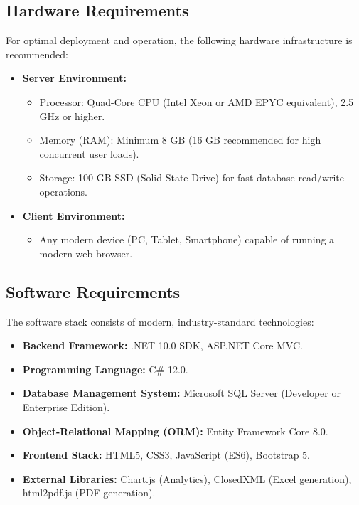 \documentclass[conference]{IEEEtran}
\begin{document}
\subsection{Hardware Requirements}
For optimal deployment and operation, the following hardware infrastructure is recommended:
\begin{itemize}
    \item \textbf{Server Environment:} 
    \begin{itemize}
        \item Processor: Quad-Core CPU (Intel Xeon or AMD EPYC equivalent), 2.5 GHz or higher.
        \item Memory (RAM): Minimum 8 GB (16 GB recommended for high concurrent user loads).
        \item Storage: 100 GB SSD (Solid State Drive) for fast database read/write operations.
    \end{itemize}
    \item \textbf{Client Environment:}
    \begin{itemize}
        \item Any modern device (PC, Tablet, Smartphone) capable of running a modern web browser.
    \end{itemize}
\end{itemize}

\subsection{Software Requirements}
The software stack consists of modern, industry-standard technologies:
\begin{itemize}
    \item \textbf{Backend Framework:} .NET 10.0 SDK, ASP.NET Core MVC.
    \item \textbf{Programming Language:} C\# 12.0.
    \item \textbf{Database Management System:} Microsoft SQL Server (Developer or Enterprise Edition).
    \item \textbf{Object-Relational Mapping (ORM):} Entity Framework Core 8.0.
    \item \textbf{Frontend Stack:} HTML5, CSS3, JavaScript (ES6), Bootstrap 5.
    \item \textbf{External Libraries:} Chart.js (Analytics), ClosedXML (Excel generation), html2pdf.js (PDF generation).
\end{itemize}
\end{document}
